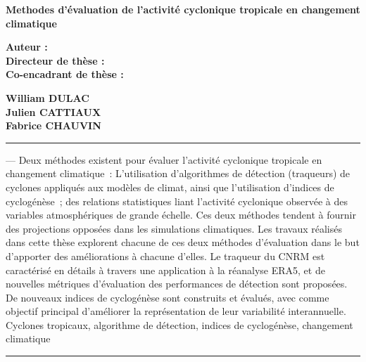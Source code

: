 \documentclass[../main.tex]{subfiles}
\begin{document}
\cleartoevenpage[\thispagestyle{empty}]
\thispagestyle{empty}

\begin{center}
\Large\textbf{Methodes d'évaluation de l'activité cyclonique tropicale en changement climatique\\}
\end{center}
\vspace{1cm}

	\begin{minipage}[t]{0.495\textwidth}

		\large{\textbf{Auteur :}} \\
		\large{\textbf{Directeur de thèse :}} \\
  		\large{\textbf{Co-encadrant de thèse :}}

	\end{minipage}
	\hfill{}
	\begin{minipage}[t]{0.495\textwidth}

		\large{\textbf{William DULAC}} \\
		\large{\textbf{Julien CATTIAUX}} \\
  		\large{\textbf{Fabrice CHAUVIN}}\\

	\end{minipage}

\noindent\rule[2pt]{\textwidth}{0.5pt}

 --- Deux méthodes existent pour évaluer l’activité cyclonique tropicale en changement climatique : L’utilisation
d’algorithmes de détection (traqueurs) de cyclones appliqués aux modèles de climat, ainsi que l’utilisation d’indices de cyclogénèse ; des relations
statistiques liant l’activité cyclonique observée à des variables atmosphériques de grande échelle. Ces deux méthodes tendent à fournir des projections opposées
dans les simulations climatiques. Les travaux réalisés dans cette thèse explorent chacune de ces deux méthodes d’évaluation dans le but d’apporter des
améliorations à chacune d’elles. Le traqueur du CNRM est caractérisé en détails à travers une application à la réanalyse ERA5, et de nouvelles métriques
d’évaluation des performances de détection sont proposées. De nouveaux indices de cyclogénèse sont construits et évalués, avec comme objectif principal
d’améliorer la représentation de leur variabilité interannuelle.\\
    Cyclones tropicaux, algorithme de détection, indices de cyclogénèse, changement climatique 
\\
\noindent\rule[2pt]{\textwidth}{0.5pt}
\end{document}
